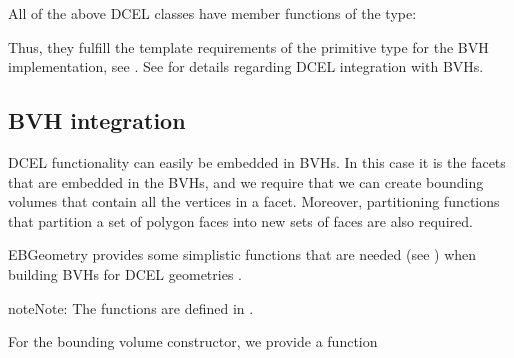 \documentclass[letterpaper,10pt,english]{sphinxmanual}
\begin{document}
\sphinxAtStartPar
All of the above DCEL classes have member functions of the type:

\begin{sphinxVerbatim}[commandchars=\\\{\}]
     
     
\end{sphinxVerbatim}

\sphinxAtStartPar
Thus, they fulfill the template requirements of the primitive type for the BVH implementation, see {\hyperref[\detokenize{ImplemBVH:chap-bvhconstraints}]{}}.
See {\hyperref[\detokenize{ImplemDCEL:chap-bvhintegration}]{}} for details regarding DCEL integration with BVHs.


\subsection{BVH integration}
\label{\detokenize{ImplemDCEL:bvh-integration}}\label{\detokenize{ImplemDCEL:chap-bvhintegration}}
\sphinxAtStartPar
DCEL functionality can easily be embedded in BVHs.
In this case it is the facets that are embedded in the BVHs, and we require that we can create bounding volumes that contain all the vertices in a facet.
Moreover, partitioning functions that partition a set of polygon faces into  new sets of faces are also required.

\sphinxAtStartPar
EBGeometry provides some simplistic functions that are needed (see {\hyperref[\detokenize{ImplemBVH:chap-bvhconstruction}]{}}) when building BVHs for DCEL geometries .

\begin{sphinxadmonition}{note}{Note:}
\sphinxAtStartPar
The functions are defined in .
\end{sphinxadmonition}

\sphinxAtStartPar
For the bounding volume constructor, we provide a function
\end{document}
